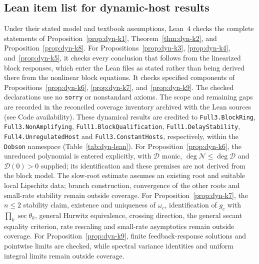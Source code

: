 \subsection{Lean item list for dynamic-host results}\label{esm:trim-dyn-lean}
Under their stated model and textbook assumptions, Lean~4 checks the complete statements of Proposition~\ref{prop:dyn-k1}, Theorem~\ref{thm:dyn-k2}, and Proposition~\ref{prop:dyn-k8}. For Propositions~\ref{prop:dyn-k3}, \ref{prop:dyn-k4}, and~\ref{prop:dyn-k5}, it checks every conclusion that follows from the linearized block responses, which enter the Lean files as stated rather than being derived there from the nonlinear block equations. It checks specified components of Propositions~\ref{prop:dyn-k6}, \ref{prop:dyn-k7}, and~\ref{prop:dyn-k9}. The checked declarations use no \texttt{sorry} or nonstandard axioms. The scope and remaining gaps are recorded in the reconciled coverage inventory archived with the Lean sources (see Code availability). These dynamical results are credited to \texttt{Full3.BlockRing}, \texttt{Full3.NonAmplifying}, \texttt{Full1.BlockQualification}, \texttt{Full1.DelayStability}, \texttt{Full4.UnregulatedHost} and \texttt{Full3.ConstantHosts}, respectively, within the \texttt{Dobson} namespace (Table~\ref{tab:dyn-lean}). For Proposition~\ref{prop:dyn-k6}, the unreduced polynomial is entered explicitly, with $\mathcal{D}$ monic, $\deg\mathcal{N}\le\deg\mathcal{D}$ and $\mathcal{D}(0)>0$ supplied; its identification and these premises are not derived from the block model. The slow-root estimate assumes an existing root and suitable local Lipschitz data; branch construction, convergence of the other roots and small-rate stability remain outside coverage. For Proposition~\ref{prop:dyn-k7}, the $n\le2$ stability claim, existence and uniqueness of $\omega_c$, identification of $g_c$ with $\prod_k\sec\theta_k$, general Hurwitz equivalence, crossing direction, the general secant equality criterion, rate rescaling and small-rate asymptotics remain outside coverage. For Proposition~\ref{prop:dyn-k9}, finite feedback-response solutions and pointwise limits are checked, while spectral variance identities and uniform integral limits remain outside coverage.

